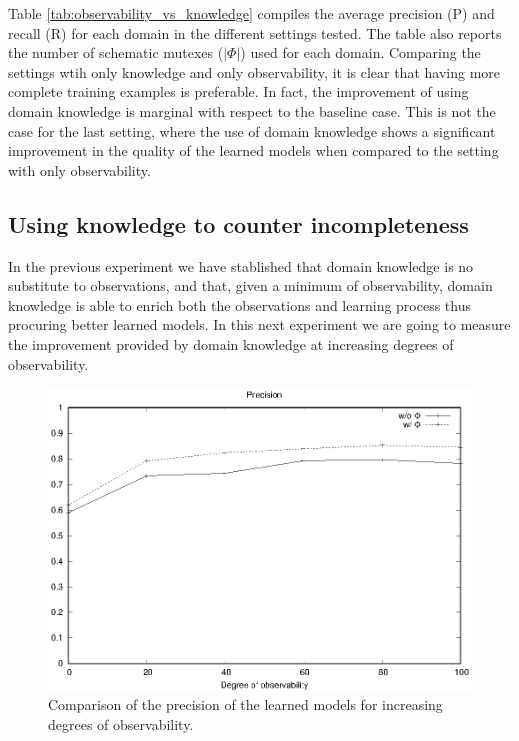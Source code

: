\documentclass{article}
\begin{document}
Table \ref{tab:observability_vs_knowledge} compiles the average precision (P) and recall (R) for each domain in the different settings tested. The table also reports the number of schematic mutexes ($|\Phi|$) used for each domain. Comparing the settings wtih only knowledge and only observability, it is clear that having more complete training examples is preferable. In fact, the improvement of using domain knowledge is marginal with respect to the baseline case. This is not the case for the last setting, where the use of domain knowledge shows a significant improvement in the quality of the learned models when compared to the setting with only observability.

\subsection{Using knowledge to counter incompleteness}
In the previous experiment we have stablished that domain knowledge is no substitute to observations, and that, given a minimum of observability, domain knowledge is able to enrich both the observations and learning process thus procuring better learned models. In this next experiment we are going to measure the improvement provided by domain knowledge at increasing degrees of observability.

\begin{figure}[hbt!]
	\centering
	\includegraphics[width=\linewidth]{figures/comparison_precision.eps}
	\caption{Comparison of the precision of the learned models for increasing degrees of observability.}
	\label{fig:comparison_precision}
\end{figure}
\end{document}
